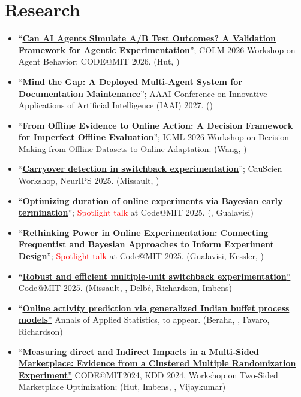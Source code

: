 \documentclass[10pt, a4paper]{article}
\newcommand{\years}[1]{\marginnote{\scriptsize #1}}
\begin{document}
\section*{Research}
\begin{itemize}
	\item ``\href{https://arxiv.org/abs/2608.02345}{\textbf{Can AI Agents Simulate A/B Test Outcomes? A Validation Framework for Agentic Experimentation}}''; COLM 2026 Workshop on Agent Behavior; CODE@MIT 2026. (Hut, \mm)
	\item ``\textbf{Mind the Gap: A Deployed Multi-Agent System for Documentation Maintenance}''; AAAI Conference on Innovative Applications of Artificial Intelligence (IAAI) 2027. (\mm)
	\item ``\textbf{From Offline Evidence to Online Action: A Decision Framework for Imperfect Offline Evaluation}''; ICML 2026 Workshop on Decision-Making from Offline Datasets to Online Adaptation. (Wang, \mm)
	\item ``\href{https://www.amazon.science/publications/carryover-detection-in-switchback-experimentation}{\textbf{Carryover detection in switchback experimentation}}''; CauScien Workshop, NeurIPS 2025. (Missault, \mm)
	\item ``\href{https://www.amazon.science/publications/optimizing-duration-of-online-experiments-via-bayesian-early-termination}{\textbf{Optimizing duration of online experiments via Bayesian early termination}}''; \textcolor{red}{Spotlight talk} at Code@MIT 2025. (\mm, Gualavisi)
	\item ``\href{https://www.amazon.science/publications/statistical-power-calculations-revisited-incorporating-beliefs-about-effect-sizes}{\textbf{Rethinking Power in Online Experimentation: Connecting Frequentist and Bayesian Approaches to Inform Experiment Design}}''; \textcolor{red}{Spotlight talk} at Code@MIT 2025. (Gualavisi, Kessler, \mm)
	\item ``\href{https://arxiv.org/abs/2506.12654}{{\textbf{Robust and efficient multiple-unit switchback experimentation}}''} Code@MIT 2025. (Missault, \mm, Delb\'{e}, Richardson, Imbens)
	\item ``\href{https://arxiv.org/abs/2505.19643}{{\textbf{Online activity prediction via generalized Indian buffet process models}}''} Annals of Applied Statistics, to appear. (Beraha, \mm, Favaro, Richardson)
	\item ``\href{https://drive.google.com/drive/folders/1557KDfzlwEi-Pn3J0fDgMX3XWwSqyeij}{{\textbf{Measuring direct and Indirect Impacts in a Multi-Sided Marketplace: Evidence from a Clustered Multiple Randomization Experiment}}''} CODE@MIT2024, KDD 2024, Workshop on Two-Sided Marketplace Optimization; (Hut, Imbens, \mm, Vijaykumar)

\end{itemize}
\end{document}
